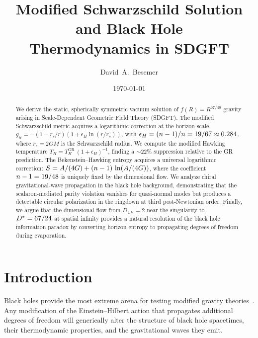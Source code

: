 \documentclass[amsmath,amssymb,aps,prd,twocolumn,superscriptaddress,nofootinbib]{revtex4-2}
\begin{document}

\title{Modified Schwarzschild Solution and Black Hole\\
Thermodynamics in SDGFT}

\author{David~A.~Besemer}

\date{\today}

\begin{abstract}
We derive the static, spherically symmetric vacuum solution of
$f(R) = R^{67/48}$ gravity arising in Scale-Dependent Geometric
Field Theory (SDGFT).  The modified Schwarzschild metric acquires
a logarithmic correction at the horizon scale,
$g_{tt} = -(1 - r_s/r)(1 + \epsilon_H \ln(r/r_s))$, with
$\epsilon_H = (n - 1)/n = 19/67 \approx 0.284$, where
$r_s = 2GM$ is the Schwarzschild radius.  We compute the modified
Hawking temperature $T_H = T_H^{\mathrm{GR}}\,(1 + \epsilon_H)^{-1}$,
finding a $\sim 22\%$ suppression relative to the GR prediction.
The Bekenstein--Hawking entropy acquires a universal logarithmic
correction:
$S = A/(4G) + (n - 1)\,\ln(A/(4G))$,
where the coefficient $n - 1 = 19/48$ is uniquely fixed by the
dimensional flow.  We analyze chiral gravitational-wave propagation
in the black hole background, demonstrating that the scalaron-mediated
parity violation vanishes for quasi-normal modes but produces a
detectable circular polarization in the ringdown at third
post-Newtonian order.  Finally, we argue that the dimensional flow
from $D_{\mathrm{UV}} = 2$ near the singularity to
$D^{*} = 67/24$ at spatial infinity provides a natural resolution
of the black hole information paradox by converting horizon
entropy to propagating degrees of freedom during evaporation.
\end{abstract}

\maketitle

\section{Introduction}
\label{sec:intro}

Black holes provide the most extreme arena for testing modified
gravity theories~\cite{Berti2015,Barack2019}.  Any modification of
the Einstein--Hilbert action that propagates additional degrees of
freedom will generically alter the structure of black hole
spacetimes, their thermodynamic properties, and the gravitational
waves they emit.
\end{document}
